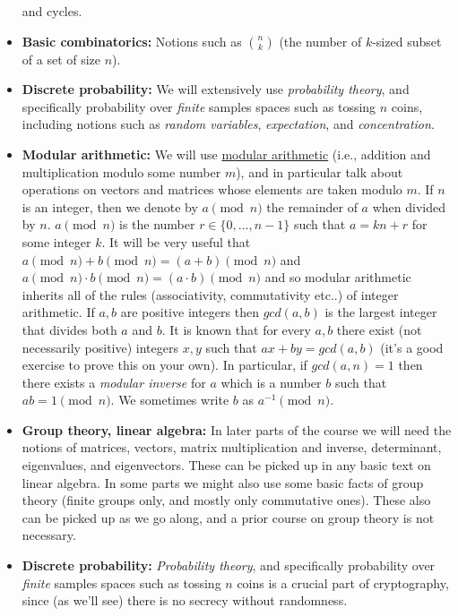 \begin{itemize}
  and cycles.
\item
  \textbf{Basic combinatorics:} Notions such as \(\binom{n}{k}\) (the
  number of \(k\)-sized subset of a set of size \(n\)).
\item
  \textbf{Discrete probability:} We will extensively use
  \emph{probability theory}, and specifically probability over
  \emph{finite} samples spaces such as tossing \(n\) coins, including
  notions such as \emph{random variables}, \emph{expectation}, and
  \emph{concentration}.
\item
  \textbf{Modular arithmetic:} We will use
  \href{https://en.wikipedia.org/wiki/Modular_arithmetic}{modular
  arithmetic} (i.e., addition and multiplication modulo some number
  \(m\)), and in particular talk about operations on vectors and
  matrices whose elements are taken modulo \(m\). If \(n\) is an
  integer, then we denote by \(a \pmod{n}\) the remainder of \(a\) when
  divided by \(n\). \(a\pmod{n}\) is the number \(r\in\{0,\ldots,n-1\}\)
  such that \(a = kn+r\) for some integer \(k\). It will be very useful
  that \(a\pmod{n} + b \pmod{n} = (a+b) \pmod{n}\) and
  \(a\pmod{n} \cdot b \pmod{n} = (a\cdot b) \pmod{n}\) and so modular
  arithmetic inherits all of the rules (associativity, commutativity
  etc..) of integer arithmetic. If \(a,b\) are positive integers then
  \(gcd(a,b)\) is the largest integer that divides both \(a\) and \(b\).
  It is known that for every \(a,b\) there exist (not necessarily
  positive) integers \(x,y\) such that \(ax + by = gcd(a,b)\) (it's a
  good exercise to prove this on your own). In particular, if
  \(gcd(a,n)=1\) then there exists a \emph{modular inverse} for \(a\)
  which is a number \(b\) such that \(ab = 1 \pmod{n}\). We sometimes
  write \(b\) as \(a^{-1} \pmod{n}\).
\item
  \textbf{Group theory, linear algebra:} In later parts of the course we
  will need the notions of matrices, vectors, matrix multiplication and
  inverse, determinant, eigenvalues, and eigenvectors. These can be
  picked up in any basic text on linear algebra. In some parts we might
  also use some basic facts of group theory (finite groups only, and
  mostly only commutative ones). These also can be picked up as we go
  along, and a prior course on group theory is not necessary.
\item
  \textbf{Discrete probability:} \emph{Probability theory}, and
  specifically probability over \emph{finite} samples spaces such as
  tossing \(n\) coins is a crucial part of cryptography, since (as we'll
  see) there is no secrecy without randomness.
\end{itemize}


